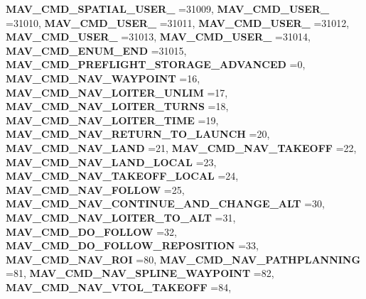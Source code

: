 \begin{DoxyCompactItemize}
\textbf{ M\+A\+V\+\_\+\+C\+M\+D\+\_\+\+S\+P\+A\+T\+I\+A\+L\+\_\+\+U\+S\+E\+R\+\_} =31009, 
\newline
\textbf{ M\+A\+V\+\_\+\+C\+M\+D\+\_\+\+U\+S\+E\+R\+\_} =31010, 
\textbf{ M\+A\+V\+\_\+\+C\+M\+D\+\_\+\+U\+S\+E\+R\+\_} =31011, 
\textbf{ M\+A\+V\+\_\+\+C\+M\+D\+\_\+\+U\+S\+E\+R\+\_} =31012, 
\textbf{ M\+A\+V\+\_\+\+C\+M\+D\+\_\+\+U\+S\+E\+R\+\_} =31013, 
\newline
\textbf{ M\+A\+V\+\_\+\+C\+M\+D\+\_\+\+U\+S\+E\+R\+\_} =31014, 
\textbf{ M\+A\+V\+\_\+\+C\+M\+D\+\_\+\+E\+N\+U\+M\+\_\+\+E\+ND} =31015, 
\textbf{ M\+A\+V\+\_\+\+C\+M\+D\+\_\+\+P\+R\+E\+F\+L\+I\+G\+H\+T\+\_\+\+S\+T\+O\+R\+A\+G\+E\+\_\+\+A\+D\+V\+A\+N\+C\+ED} =0, 
\textbf{ M\+A\+V\+\_\+\+C\+M\+D\+\_\+\+N\+A\+V\+\_\+\+W\+A\+Y\+P\+O\+I\+NT} =16, 
\newline
\textbf{ M\+A\+V\+\_\+\+C\+M\+D\+\_\+\+N\+A\+V\+\_\+\+L\+O\+I\+T\+E\+R\+\_\+\+U\+N\+L\+IM} =17, 
\textbf{ M\+A\+V\+\_\+\+C\+M\+D\+\_\+\+N\+A\+V\+\_\+\+L\+O\+I\+T\+E\+R\+\_\+\+T\+U\+R\+NS} =18, 
\textbf{ M\+A\+V\+\_\+\+C\+M\+D\+\_\+\+N\+A\+V\+\_\+\+L\+O\+I\+T\+E\+R\+\_\+\+T\+I\+ME} =19, 
\textbf{ M\+A\+V\+\_\+\+C\+M\+D\+\_\+\+N\+A\+V\+\_\+\+R\+E\+T\+U\+R\+N\+\_\+\+T\+O\+\_\+\+L\+A\+U\+N\+CH} =20, 
\newline
\textbf{ M\+A\+V\+\_\+\+C\+M\+D\+\_\+\+N\+A\+V\+\_\+\+L\+A\+ND} =21, 
\textbf{ M\+A\+V\+\_\+\+C\+M\+D\+\_\+\+N\+A\+V\+\_\+\+T\+A\+K\+E\+O\+FF} =22, 
\textbf{ M\+A\+V\+\_\+\+C\+M\+D\+\_\+\+N\+A\+V\+\_\+\+L\+A\+N\+D\+\_\+\+L\+O\+C\+AL} =23, 
\textbf{ M\+A\+V\+\_\+\+C\+M\+D\+\_\+\+N\+A\+V\+\_\+\+T\+A\+K\+E\+O\+F\+F\+\_\+\+L\+O\+C\+AL} =24, 
\newline
\textbf{ M\+A\+V\+\_\+\+C\+M\+D\+\_\+\+N\+A\+V\+\_\+\+F\+O\+L\+L\+OW} =25, 
\textbf{ M\+A\+V\+\_\+\+C\+M\+D\+\_\+\+N\+A\+V\+\_\+\+C\+O\+N\+T\+I\+N\+U\+E\+\_\+\+A\+N\+D\+\_\+\+C\+H\+A\+N\+G\+E\+\_\+\+A\+LT} =30, 
\textbf{ M\+A\+V\+\_\+\+C\+M\+D\+\_\+\+N\+A\+V\+\_\+\+L\+O\+I\+T\+E\+R\+\_\+\+T\+O\+\_\+\+A\+LT} =31, 
\textbf{ M\+A\+V\+\_\+\+C\+M\+D\+\_\+\+D\+O\+\_\+\+F\+O\+L\+L\+OW} =32, 
\newline
\textbf{ M\+A\+V\+\_\+\+C\+M\+D\+\_\+\+D\+O\+\_\+\+F\+O\+L\+L\+O\+W\+\_\+\+R\+E\+P\+O\+S\+I\+T\+I\+ON} =33, 
\textbf{ M\+A\+V\+\_\+\+C\+M\+D\+\_\+\+N\+A\+V\+\_\+\+R\+OI} =80, 
\textbf{ M\+A\+V\+\_\+\+C\+M\+D\+\_\+\+N\+A\+V\+\_\+\+P\+A\+T\+H\+P\+L\+A\+N\+N\+I\+NG} =81, 
\textbf{ M\+A\+V\+\_\+\+C\+M\+D\+\_\+\+N\+A\+V\+\_\+\+S\+P\+L\+I\+N\+E\+\_\+\+W\+A\+Y\+P\+O\+I\+NT} =82, 
\newline
\textbf{ M\+A\+V\+\_\+\+C\+M\+D\+\_\+\+N\+A\+V\+\_\+\+V\+T\+O\+L\+\_\+\+T\+A\+K\+E\+O\+FF} =84, 

\end{DoxyCompactItemize}
